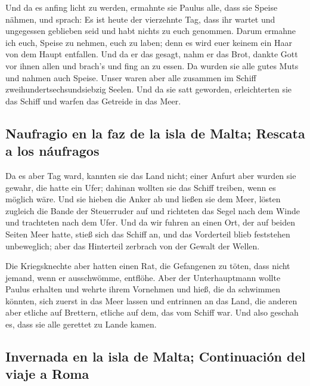  Und da es anfing licht zu werden, ermahnte sie Paulus
alle, dass sie Speise nähmen, und sprach: Es ist heute der vierzehnte
Tag, dass ihr wartet und ungegessen geblieben seid und habt nichts zu
euch genommen.  Darum ermahne ich euch, Speise zu nehmen,
euch zu laben; denn es wird euer keinem ein Haar von dem Haupt
entfallen.  Und da er das gesagt, nahm er das Brot,
dankte Gott vor ihnen allen und brach's und fing an zu essen.
 Da wurden sie alle gutes Muts und nahmen auch Speise.
 Unser waren aber alle zusammen im Schiff
zweihundertsechsundsiebzig Seelen.  Und da sie satt
geworden, erleichterten sie das Schiff und warfen das Getreide in das
Meer.

\hypertarget{naufragio-en-la-faz-de-la-isla-de-malta-rescata-a-los-nuxe1ufragos}{%
\subsection{Naufragio en la faz de la isla de Malta; Rescata a los
náufragos}\label{naufragio-en-la-faz-de-la-isla-de-malta-rescata-a-los-nuxe1ufragos}}

 Da es aber Tag ward, kannten sie das Land nicht; einer
Anfurt aber wurden sie gewahr, die hatte ein Ufer; dahinan wollten sie
das Schiff treiben, wenn es möglich wäre.  Und sie hieben
die Anker ab und ließen sie dem Meer, lösten zugleich die Bande der
Steuerruder auf und richteten das Segel nach dem Winde und trachteten
nach dem Ufer.  Und da wir fuhren an einen Ort, der auf
beiden Seiten Meer hatte, stieß sich das Schiff an, und das Vorderteil
blieb feststehen unbeweglich; aber das Hinterteil zerbrach von der
Gewalt der Wellen.

 Die Kriegsknechte aber hatten einen Rat, die Gefangenen
zu töten, dass nicht jemand, wenn er ausschwömme, entflöhe.
 Aber der Unterhauptmann wollte Paulus erhalten und
wehrte ihrem Vornehmen und hieß, die da schwimmen könnten, sich zuerst
in das Meer lassen und entrinnen an das Land,  die
anderen aber etliche auf Brettern, etliche auf dem, das vom Schiff war.
Und also geschah es, dass sie alle gerettet zu Lande kamen.

\hypertarget{invernada-en-la-isla-de-malta-continuaciuxf3n-del-viaje-a-roma}{%
\subsection{Invernada en la isla de Malta; Continuación del viaje a
Roma}\label{invernada-en-la-isla-de-malta-continuaciuxf3n-del-viaje-a-roma}}

